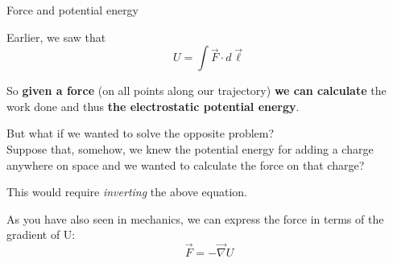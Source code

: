 
%
%
%

\begin{frame}{Force and potential energy}

Earlier, we saw that
\begin{equation*}
  U = \int \vec{F} \cdot d\vec{\ell}
\end{equation*}

So {\bf given a force} (on all points along our trajectory)
{\bf we can calculate} the work done and thus {\bf the electrostatic potential energy}.\\

\vspace{0.3cm}

But what if we wanted to solve the opposite problem?\\
Suppose that, somehow, we knew the potential energy for adding a charge anywhere on space
and we wanted to calculate the force on that charge?\\

\vspace{0.2cm}

This would require {\em inverting} the above equation.\\

\vspace{0.2cm}

As you have also seen in mechanics,
we can express the force in terms of the gradient of U:
\begin{equation*}
  \vec{F} = -\vec{\nabla}U
\end{equation*}

\end{frame}

%
%


